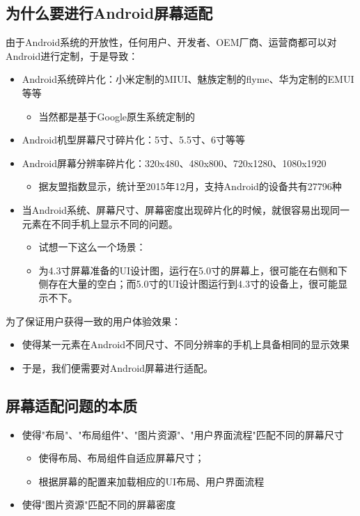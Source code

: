 \documentclass[9pt, b5paper]{article}
\begin{document}
\subsection{为什么要进行Android屏幕适配}
\label{sec-1-5}

由于Android系统的开放性，任何用户、开发者、OEM厂商、运营商都可以对Android进行定制，于是导致：
\begin{itemize}
\item Android系统碎片化：小米定制的MIUI、魅族定制的flyme、华为定制的EMUI等等
\begin{itemize}
\item 当然都是基于Google原生系统定制的
\end{itemize}
\item Android机型屏幕尺寸碎片化：5寸、5.5寸、6寸等等
\item Android屏幕分辨率碎片化：320x480、480x800、720x1280、1080x1920
\begin{itemize}
\item 据友盟指数显示，统计至2015年12月，支持Android的设备共有27796种
\end{itemize}
\item 当Android系统、屏幕尺寸、屏幕密度出现碎片化的时候，就很容易出现同一元素在不同手机上显示不同的问题。
\begin{itemize}
\item 试想一下这么一个场景：
\item 为4.3寸屏幕准备的UI设计图，运行在5.0寸的屏幕上，很可能在右侧和下侧存在大量的空白；而5.0寸的UI设计图运行到4.3寸的设备上，很可能显示不下。
\end{itemize}
\end{itemize}

为了保证用户获得一致的用户体验效果：
\begin{itemize}
\item 使得某一元素在Android不同尺寸、不同分辨率的手机上具备相同的显示效果
\item 于是，我们便需要对Android屏幕进行适配。
\end{itemize}

\subsection{屏幕适配问题的本质}
\label{sec-1-6}
\begin{itemize}
\item 使得"布局"、"布局组件"、"图片资源"、"用户界面流程"匹配不同的屏幕尺寸
\begin{itemize}
\item 使得布局、布局组件自适应屏幕尺寸；
\item 根据屏幕的配置来加载相应的UI布局、用户界面流程
\end{itemize}
\item 使得"图片资源"匹配不同的屏幕密度
\end{itemize}
\end{document}

